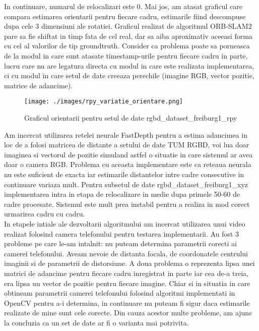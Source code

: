 \documentclass[12pt,a4paper]{report}
\begin{document}
In continuare, numarul de relocalizari este 0. Mai jos, am atasat graficul care compara 
estimarea orientarii pentru fiecare cadru, estimarile fiind descompuse dupa cele 3 dimensiuni
ale rotatiei. Graficul realizat de algoritmul ORB-SLAM2 pare sa fie shiftat in timp fata 
de cel real, dar sa aiba aproximativ aceeasi forma cu cel al valorilor de tip groundtruth.
Consider ca problema poate sa porneasca de la modul in care sunt atasate timestamp-urile 
pentru fiecare cadru in parte, lucru care nu are legatura directa cu modul in care este
realizata implementarea, ci cu modul in care setul de date creeaza perechile (imagine RGB, 
vector pozitie, matrice de adancime).      
\begin{figure}[htbp] 
  \centering
  \texttt{[image: ./images/rpy\_variatie\_orientare.png]}
  \caption{Graficul orientarii pentru setul de date rgbd\_dataset\_freiburg1\_rpy}
  \label{fig:exemplu_imagine}
\end{figure}
Am incercat utilizarea retelei neurale FastDepth pentru a estima adancimea in loc de a
folosi matricea de distante a setului de date TUM RGBD, voi lua doar imaginea si vectorul 
de pozitie simuland astfel o situatie in care sistemul ar avea doar o camera RGB.
Problema cu aceasta implementare este ca reteaua neurala nu este suficient de exacta iar 
estimarile distantelor intre cadre consecutive in continuare variaza mult. Pentru 
subsetul de date rgbd\_dataset\_freiburg1\_xyz implementarea intra in etapa de relocalizare
in medie dupa primele 50{-}60 de cadre procesate. Sistemul este mult prea instabil pentru
a realiza in mod corect urmarirea cadru cu cadru. \\

In etapele intiale ale dezvoltarii algoritmului am incercat utilizarea unui video realizat 
folosind camera telefonului pentru testarea implementarii. Au fost 3 probleme pe care le-am 
intalnit: nu puteam determina parametrii corecti ai camerei telefonului. Aveam nevoie 
de distanta focala, de coordonatele centrului imaginii si de parametrii de distorsiune.
A doua problema o reprezenta lipsa unei matrici de adancime pentru fiecare cadru inregistrat
in parte iar cea de-a treia, era lipsa un vector de pozitie pentru fiecare imagine. Chiar 
si in situatia in care obtineam parametrii camerei telefonului folosind algoritmi implementati
in OpenCV pentru a-i determina, in continuare nu puteam fi sigur daca estimarile realizate 
de mine sunt cele corecte. Din cauza acestor multe probleme, am ajuns la concluzia ca un set 
de date ar fi o varianta mai potrivita.
\end{document}
